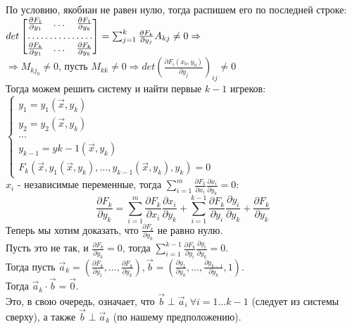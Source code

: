 \documentclass[12pt]{article}
\begin{document}
По условию, якобиан не равен нулю, тогда распишем его по последней строке:\\
$det \begin{bmatrix}
   \frac{\partial F_1}{\partial y_1} & \dots & \frac{\partial F_1}{\partial y_k} \\
    \hdotsfor{3} \\
    \frac{\partial F_k}{\partial y_1} & \dots & \frac{\partial F_k}{\partial y_k} \\
\end{bmatrix} = \sum_{j=1}^k \frac{\partial F_k}{\partial y_j} A_{kj} \neq 0 \Rightarrow$\\
$\Rightarrow M_{kj_0} \neq 0$, пусть $M_{kk} \neq 0 \Rightarrow det(\frac{\partial F_i(x_0,y_0)}{\partial y_j})_{ij} \neq 0$\\
Тогда можем решить систему и найти первые $k-1$ игреков:\\
$\begin{cases}y_1=y_1(\overrightarrow{x},y_k) \\ y_2=y_2(\overrightarrow{x},y_k) \\ \dots \\ y_{k-1} = y{k-1}(\overrightarrow{x},y_k) \\ F_k(\overrightarrow{x}, y_1(\overrightarrow{x},y_k),\dots,y_{k-1}(\overrightarrow{x},y_k),y_k)=0 \end{cases}$\\
$x_i$ - независимые переменные, тогда $\sum_{i=1}^m \frac{\partial F_k}{\partial x_i} \frac{\partial x_i}{\partial y_k} = 0$:\\
$$\frac{\partial F_k}{\partial y_k} = \sum_{i=1}^m \frac{\partial F_k}{\partial x_i} \frac{\partial x_i}{\partial y_k} + \sum_{i=1}^{k-1} \frac{\partial F_k}{\partial y_i} \frac{\partial y_i}{\partial y_k} + \frac{\partial F_k}{\partial y_k}$$
Теперь мы хотим доказать, что $\frac{\partial F_k}{\partial y_k}$ не равно нулю.\\
Пусть это не так, и $\frac{\partial F_k}{\partial y_k} = 0$, тогда $\sum_{i=1}^{k-1} \frac{\partial F_k}{\partial y_i} \frac{\partial y_i}{\partial y_k}=0$.\\
Тогда пусть $\overrightarrow{a}_k = (\frac{\partial F_k}{\partial y_1},\dots,\frac{\partial F_k}{\partial y_k}), \overrightarrow{b}=(\frac{\partial y_1}{\partial y_k},\dots,\frac{\partial y_{k-1}}{\partial y_k},1)$.\\
Тогда $\overrightarrow{a}_k \cdot \overrightarrow{b} = \overrightarrow{0}$.\\
Это, в свою очередь, означает, что $\overrightarrow{b} \perp \overrightarrow{a}_i \ \forall i = 1\dots k-1$ (следует из системы сверху), а также $\overrightarrow{b} \perp \overrightarrow{a}_k$ (по нашему предположению).\\
\end{document}
